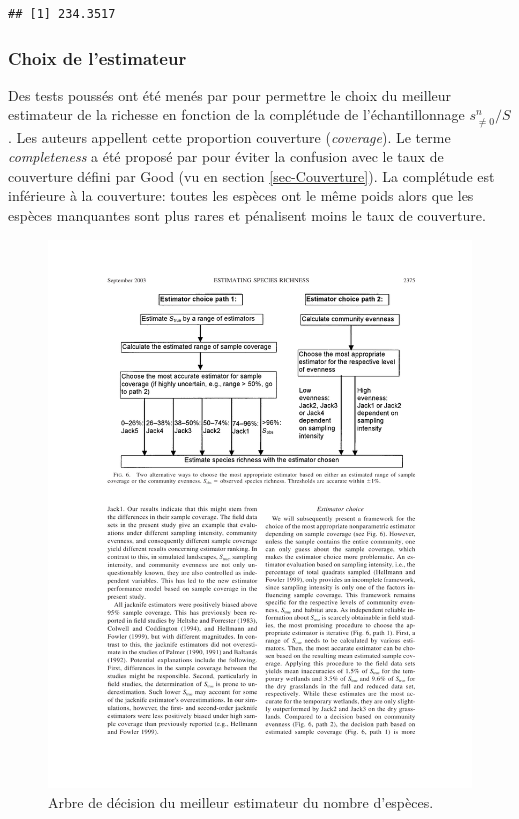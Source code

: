 \documentclass[
  11pt,
  french,
  a4paper,
  extrafontsizes,onecolumn,openright
  ]{memoir}
\begin{document}
\begin{verbatim}
## [1] 234.3517
\end{verbatim}

\normalsize

\hypertarget{sec-ChoixEstimateur}{%
\subsubsection{Choix de l'estimateur}\label{sec-ChoixEstimateur}}

Des tests poussés ont été menés par \textcite{Brose2003} pour permettre le choix du meilleur estimateur de la richesse en fonction de la complétude de l'échantillonnage \(s^{n}_{\ne 0}/{S}\).
Les auteurs appellent cette proportion couverture (\emph{coverage}).
Le terme \emph{completeness} a été proposé par \textcite{Beck2010} pour éviter la confusion avec le taux de couverture défini par Good (vu en section \ref{sec-Couverture}).
La complétude est inférieure à la couverture: toutes les espèces ont le même poids alors que les espèces manquantes sont plus rares et pénalisent moins le taux de couverture.



\scriptsize

\begin{figure}

{\centering \includegraphics[width=0.8\linewidth]{images/Brose2003} 

}

\caption{Arbre de décision du meilleur estimateur du nombre d'espèces.}\label{fig:Brose2003}
\end{figure}
\end{document}
